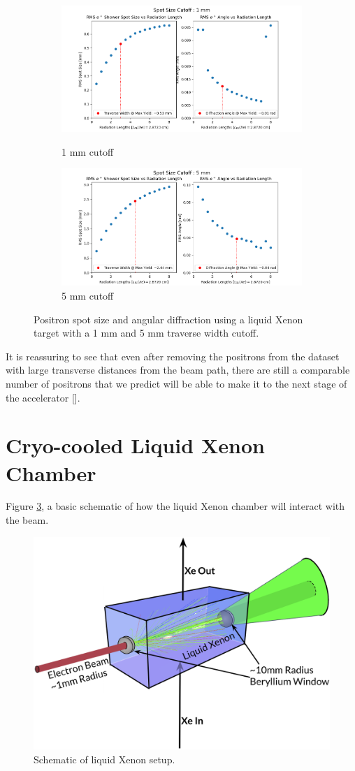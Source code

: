 \documentclass[%
reprint,
amsmath, amssymb,
aps,
floatfix,
]{revtex4-2}
\begin{document}
\begin{figure}[H]
    \begin{subfigure}{.5\textwidth}
        \includegraphics[height = .445\linewidth]{../images/XeATW1mmCutoff.png}
        \caption{\label{fig:XeATW1}1 mm cutoff}
        \includegraphics[height = .5\linewidth]{../images/XeATW5mmCutoff.png}
        \caption{\label{fig:XeATW5}5 mm cutoff}
    \end{subfigure}
    \caption{\label{fig:ATWCut}Positron spot size and angular diffraction using 
    a liquid Xenon target with a 1 mm and 5 mm traverse width cutoff.}
\end{figure}
It is reassuring to see that even after removing the positrons from the dataset 
with large transverse distances from the beam path, there are still a comparable number
of positrons that we predict will be able to make it to the next stage of the accelerator [].

\section{Cryo-cooled Liquid Xenon Chamber}
Figure \ref{fig:schem}, a basic schematic of how the liquid Xenon chamber will interact with the beam.
\begin{figure}[H]
    \includegraphics[width = .5\textwidth]{../images/Schematic4.png}
    \caption{\label{fig:schem}Schematic of liquid Xenon setup.}
\end{figure}
\end{document}
